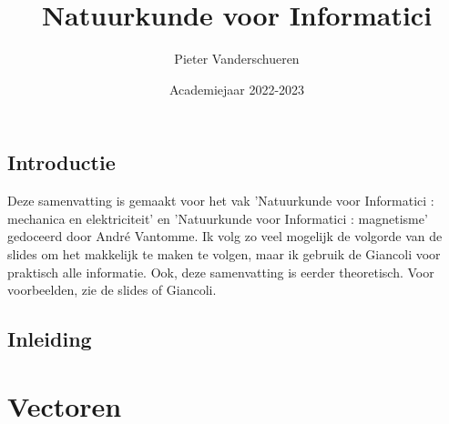 \documentclass{exam}
\title{Natuurkunde voor Informatici}
\author{Pieter Vanderschueren}
\date{Academiejaar 2022-2023}
\newcommand{\RomanNumeralCaps}[1]{\MakeUppercase{\romannumeral #1}}
\begin{document}
\begin{titlingpage}
\maketitle
\end{titlingpage}


\newpage

\vspace*{\fill}
\begin{center}
    
\section*{Introductie}
\end{center}

\noindent Deze samenvatting is gemaakt voor het vak 'Natuurkunde voor Informatici \RomanNumeralCaps{1}: mechanica en elektriciteit' en 'Natuurkunde  voor Informatici \RomanNumeralCaps{2}: magnetisme' gedoceerd door André Vantomme. Ik volg zo veel mogelijk de volgorde van de slides om het makkelijk te maken te volgen, maar ik gebruik de Giancoli voor praktisch alle informatie. Ook, deze samenvatting is eerder theoretisch. Voor voorbeelden, zie de slides of Giancoli.


\vspace*{\fill}

\newpage

\tableofcontents

\newpage

\vspace*{\fill}
\begin{center}
    
\section*{Inleiding}
\end{center}

\vspace*{\fill}

\newpage

\section{Vectoren}

\vspace{0.5cm}



\newpage
\end{document}
